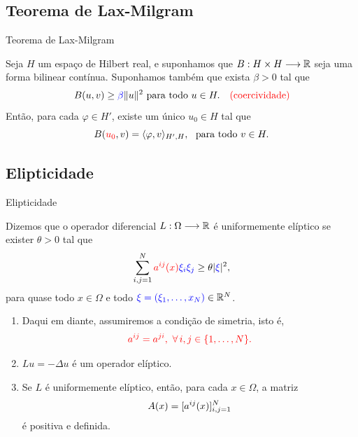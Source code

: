 \subsection*{Teorema de Lax-Milgram}
\begin{frame}{Teorema de Lax-Milgram}
\begin{teo}
Seja \(H\) um {\color{blue}espaço de Hilbert real}, e suponhamos que \(B:H\times H\longrightarrow \mathbb{R}\) seja uma {\color{blue}forma bilinear contínua}. Suponhamos também que exista {\color{blue}\(\beta>0\)} tal que
\[
B(u,v)\geq {\color{blue}\beta} \lVert u\rVert^2 \text{ para todo } u\in H. \quad {\color{red}\text{(coercividade)}}
\]
 Então, para cada \(\varphi\in H'\), existe um único {\color{red}\(u_0\in H\)} tal que 
\[
B({\color{red}u_0},v)=\innp{\varphi,v}_{H',H},\ \text{ para todo } v\in H.
\]
\end{teo}
\end{frame}
\subsection*{Elipticidade}
\begin{frame}{Elipticidade}
\begin{defin}
Dizemos que o operador diferencial {\color{red}\(L:\Omega\longrightarrow \mathbb{R} \)} é {\color{blue}uniformemente elíptico} se exister \(\theta>0\) tal que
\[
\sum_{i,j=1}^{N} {\color{red}a^{ij}(x)}{\color{blue}\xi_i\xi_j}\geq \theta |{\color{blue}\xi}|^2,
\]
para quase todo \(x\in \Omega\) e todo \({\color{blue}\xi=(\xi_1,\ldots,x_N)}\in \mathbb{R}^N\). 
\end{defin}

\end{frame}

\begin{frame}
\begin{obs}
\begin{enumerate}[a]
\item Daqui em diante, assumiremos a {\color{red}condição de simetria}, isto é, 
\[{\color{red}a^{ij}=a^{ji},\ \forall\, i,j\in \ind.}\]
\item \(Lu=-\Delta u\) é um operador elíptico.
\item Se {\color{red}\(L\) é uniformemente elíptico}, então, para cada \(x\in \Omega\), a matriz
\[
A(x)=[a^{ij}(x)]_{i,j=1}^N
\]
é {\color{red}positiva e definida}. 
\end{enumerate}
\end{obs}
\end{frame}

